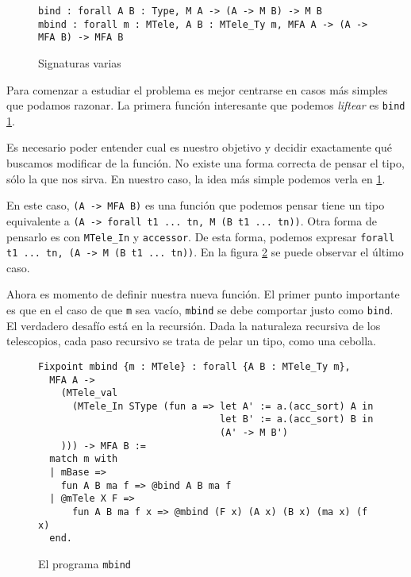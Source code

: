 

\begin{figure}[h]
  \centering
  \begin{lstlisting}
bind : forall A B : Type, M A -> (A -> M B) -> M B
mbind : forall m : MTele, A B : MTele_Ty m, MFA A -> (A -> MFA B) -> MFA B
  \end{lstlisting}
  \caption{Signaturas varias}
  \label{fig:bind}
\end{figure}

Para comenzar a estudiar el problema es mejor centrarse en casos más simples que
podamos razonar. La primera función interesante que podemos \textit{liftear} es
\lstinline{bind} \ref{fig:bind}. 

Es necesario poder entender cual es nuestro objetivo y decidir exactamente qué
buscamos modificar de la función. No existe una forma correcta de pensar el
tipo, sólo la que nos sirva. En nuestro caso, la idea más simple podemos verla
en \ref{fig:bind}.

En este caso, \lstinline{(A -> MFA B)} es una función que podemos pensar tiene un
tipo equivalente a \lstinline{(A -> forall t1 ... tn, M (B t1 ... tn))}. Otra forma
de pensarlo es con \lstinline{MTele_In} y \lstinline{accessor}. De esta forma, podemos
expresar \lstinline{forall t1 ... tn, (A -> M (B t1 ... tn))}. En la figura
\ref{fig:mbind} se puede observar el último caso. 

Ahora es momento de definir nuestra nueva función. El primer punto importante es
que en el caso de que \lstinline{m} sea vacío, \lstinline{mbind} se debe comportar justo
como \lstinline{bind}. El verdadero desafío está en la recursión. Dada la naturaleza
recursiva de los telescopios, cada paso recursivo se trata de pelar un tipo,
como una cebolla.

\begin{figure}[h]
\centering
\begin{lstlisting}
Fixpoint mbind {m : MTele} : forall {A B : MTele_Ty m},
  MFA A ->
    (MTele_val
      (MTele_In SType (fun a => let A' := a.(acc_sort) A in
                                let B' := a.(acc_sort) B in
                                (A' -> M B')
    ))) -> MFA B :=
  match m with
  | mBase =>
    fun A B ma f => @bind A B ma f
  | @mTele X F =>
      fun A B ma f x => @mbind (F x) (A x) (B x) (ma x) (f x)
  end.
\end{lstlisting}
\caption{El programa \lstinline{mbind}}
\label{fig:mbind}
\end{figure}

